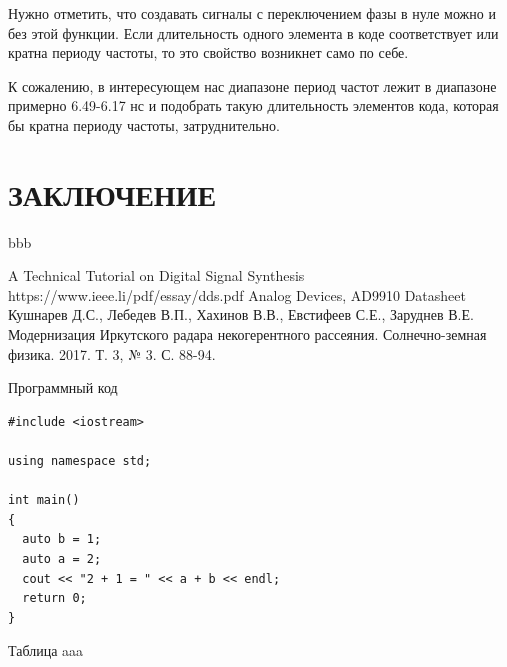 \documentclass[rusmathsym, eqnumwithinsec, amspack, hyperref]{bomgost}
\begin{document}
Нужно отметить, что создавать сигналы с переключением фазы в нуле можно и без этой функции. Если длительность одного элемента в коде соответствует или кратна периоду частоты, то это свойство возникнет само по себе.

К сожалению, в интересующем нас диапазоне период частот лежит в диапазоне примерно 6.49-6.17 нс и подобрать такую длительность элементов кода, которая бы кратна периоду частоты, затруднительно.

\section*{ЗАКЛЮЧЕНИЕ}
bbb

\begin{thebibliography}{11}
 A Technical Tutorial
on Digital Signal Synthesis https://www.ieee.li/pdf/essay/dds.pdf
 Analog Devices, AD9910 Datasheet
 Кушнарев Д.С., Лебедев В.П., Хахинов В.В., Евстифеев С.Е., Заруднев В.Е. Модернизация Иркутского радара некогерентного рассеяния. Солнечно-земная физика. 2017. Т. 3, № 3. С. 88-94.
\end{thebibliography}

\appendix

\begin{gostappendix}{Программный код}
\lstset{language=[11]c++,basicstyle=\ttfamily, showstringspaces=false}

\begin{lstlisting}
#include <iostream>

using namespace std;

int main()
{
  auto b = 1;
  auto a = 2;
  cout << "2 + 1 = " << a + b << endl;
  return 0;
}
\end{lstlisting}
\end{gostappendix}


\begin{gostappendix}{Таблица}
aaa
\end{gostappendix}
\end{document}
